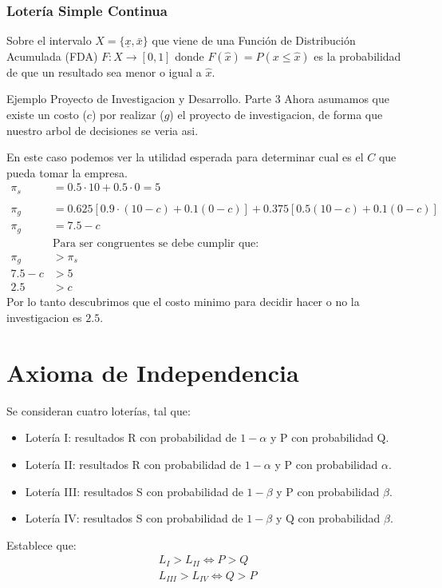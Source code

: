 \documentclass[12pt]{article}
\begin{document}
\subsubsection{Lotería Simple Continua}
Sobre el intervalo $X=\{ {{\underline{x}},\bar{x}}\}$ que viene de una Función de Distribución Acumulada (FDA) $F:X\rightarrow[0,1]$ donde $F(\hat{x})=P(x \leq \hat{x})$ es la probabilidad de que un resultado sea menor o igual a $\hat{x}$. 
\begin{ejemplo}{Ejemplo Proyecto de Investigacion y Desarrollo. Parte 3}
    Ahora asumamos que existe un costo ($c$) por realizar ($g$) el proyecto de investigacion, de forma que nuestro arbol de decisiones se veria asi. 
     \begin{figure} [H]
        \centering
        
        \label{fig:placeholder}
    \end{figure}
    En este caso podemos ver la utilidad esperada para determinar cual es el $C$ que pueda tomar la empresa. 
    \begin{align*}
        \pi_s&=0.5\cdot 10+0.5\cdot 0=5\\\\
        \pi_g&=0.625[0.9\cdot(10-c)+0.1(0-c)]+0.375[0.5(10-c)+0.1(0-c)]\\
        \pi_g&=7.5-c\\
        & \text{Para ser congruentes se debe cumplir que:} \\ \pi_g&>\pi_s \\ 7.5-c&>5 \\ 2.5&>c 
    \end{align*}
    Por lo tanto descubrimos que el costo minimo para decidir hacer o no la investigacion es $2.5$. 
\end{ejemplo}

\section{Axioma de Independencia}
Se consideran cuatro loterías, tal que: 
\begin{itemize}
    \item Lotería I: resultados R con probabilidad de $1-\alpha$ y P con probabilidad Q. 
    \item Lotería II: resultados R con probabilidad de $1-\alpha$ y P con probabilidad $\alpha$.
    \item Lotería III: resultados S con probabilidad de $1-\beta$ y P con probabilidad $\beta$. 
    \item Lotería IV: resultados S con probabilidad de $1-\beta$ y Q con probabilidad $\beta$. 
\end{itemize}
Establece que: 
\begin{align*}
    L_I>L_{II} \iff P>Q \\ 
    L_{III}>L_{IV} \iff Q>P
\end{align*}
\newpage
\end{document}
